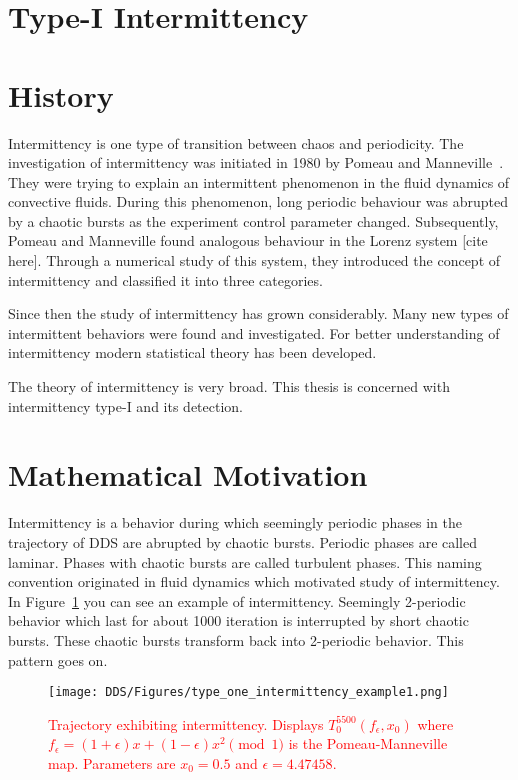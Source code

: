 \section{Type-I Intermittency}

\section{History}
Intermittency is one type of transition between chaos and periodicity.
The investigation of intermittency was initiated in 1980 by Pomeau and Manneville~\cite{Pomeau1980}.
They were trying to explain an intermittent phenomenon in the fluid dynamics of convective fluids.
During this phenomenon, long periodic behaviour was abrupted by a chaotic bursts as the experiment control parameter changed.
Subsequently, Pomeau and Manneville found analogous behaviour in the Lorenz system [cite here].
Through a numerical study of this system, they introduced the concept of intermittency and classified it into three categories.~\cite{Pomeau1980}
\par
Since then the study of intermittency has grown considerably.
Many new types of intermittent behaviors were found and investigated.
For better understanding of intermittency modern statistical theory has been developed.
~\cite{Elaskar2017}
\par
The theory of intermittency is very broad.
This thesis is concerned with intermittency type-I and its detection.

\section{Mathematical Motivation}
Intermittency is a behavior during which seemingly periodic phases in the trajectory of DDS are abrupted by chaotic bursts.
Periodic phases are called laminar.
Phases with chaotic bursts are called turbulent phases.
This naming convention originated in fluid dynamics which motivated study of intermittency.~\cite{Pomeau1980}
\\
In Figure~\ref{fig:intermittent_trajectory_example} you can see an example of intermittency.
Seemingly 2-periodic behavior which last for about 1000 iteration is interrupted by short chaotic bursts.
These chaotic bursts transform back into 2-periodic behavior.
This pattern goes on.

\begin{figure}[!h]
    \centering
    \texttt{[image: DDS/Figures/type\_one\_intermittency\_example1.png]}
    \caption{
        \textcolor{red}{
        Trajectory exhibiting intermittency. 
        Displays $T^{5500}_{0}(f_{\epsilon}, x_0)$ where $f_{\epsilon} = (1+\epsilon)x+(1-\epsilon)x^2 \pmod{1}$ is the Pomeau-Manneville map. 
        Parameters are $x_0 = 0.5$ and $\epsilon = 4.47458$.
        }
    }
    \label{fig:intermittent_trajectory_example}
\end{figure}

